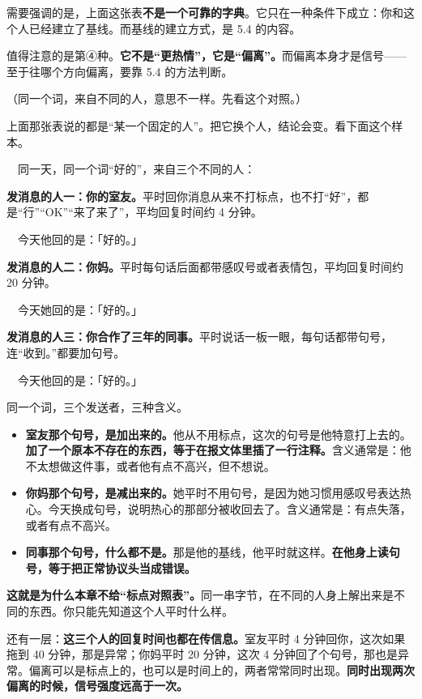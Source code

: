 需要强调的是，上面这张表\textbf{不是一个可靠的字典}。它只在一种条件下成立：你和这个人已经建立了基线。而基线的建立方式，是 5.4 的内容。

值得注意的是第④种。\textbf{它不是“更热情”，它是“偏离”。}而偏离本身才是信号——至于往哪个方向偏离，要靠 5.4 的方法判断。

（同一个词，来自不同的人，意思不一样。先看这个对照。）

上面那张表说的都是“某一个固定的人”。把它换个人，结论会变。看下面这个样本。

\begin{mdquote}
　同一天，同一个词“好的”，来自三个不同的人：

\textbf{发消息的人一：你的室友。}平时回你消息从来不打标点，也不打“好”，都是“行”“OK”“来了来了”，平均回复时间约 4 分钟。

　今天他回的是：「好的。」

\textbf{发消息的人二：你妈。}平时每句话后面都带感叹号或者表情包，平均回复时间约 20 分钟。

　今天她回的是：「好的。」

\textbf{发消息的人三：你合作了三年的同事。}平时说话一板一眼，每句话都带句号，连“收到。”都要加句号。

　今天他回的是：「好的。」
\end{mdquote}

同一个词，三个发送者，三种含义。

\begin{itemize}
\item \textbf{室友那个句号，是加出来的。}他从不用标点，这次的句号是他特意打上去的。\textbf{加了一个原本不存在的东西，等于在报文体里插了一行注释。}含义通常是：他不太想做这件事，或者他有点不高兴，但不想说。
\item \textbf{你妈那个句号，是减出来的。}她平时不用句号，是因为她习惯用感叹号表达热心。今天换成句号，说明热心的那部分被收回去了。含义通常是：有点失落，或者有点不高兴。
\item \textbf{同事那个句号，什么都不是。}那是他的基线，他平时就这样。\textbf{在他身上读句号，等于把正常协议头当成错误。}
\end{itemize}

\textbf{这就是为什么本章不给“标点对照表”。}同一串字节，在不同的人身上解出来是不同的东西。你只能先知道这个人平时什么样。

还有一层：\textbf{这三个人的回复时间也都在传信息。}室友平时 4 分钟回你，这次如果拖到 40 分钟，那是异常；你妈平时 20 分钟，这次 4 分钟回了个句号，那也是异常。偏离可以是标点上的，也可以是时间上的，两者常常同时出现。\textbf{同时出现两次偏离的时候，信号强度远高于一次。}

